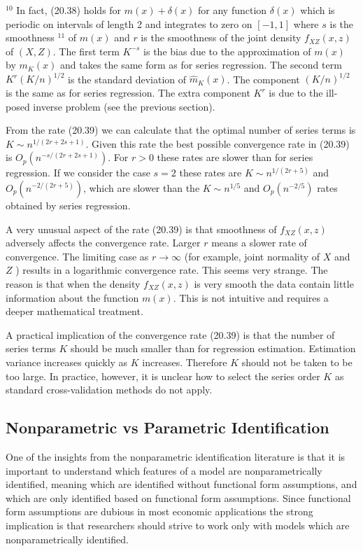 \documentclass[10pt]{article}
\begin{document}
${ }^{10}$ In fact, (20.38) holds for $m(x)+\delta(x)$ for any function $\delta(x)$ which is periodic on intervals of length 2 and integrates to zero on $[-1,1]$ where $s$ is the smoothness ${ }^{11}$ of $m(x)$ and $r$ is the smoothness of the joint density $f_{X Z}(x, z)$ of $(X, Z)$. The first term $K^{-s}$ is the bias due to the approximation of $m(x)$ by $m_{K}(x)$ and takes the same form as for series regression. The second term $K^{r}(K / n)^{1 / 2}$ is the standard deviation of $\widehat{m}_{K}(x)$. The component $(K / n)^{1 / 2}$ is the same as for series regression. The extra component $K^{r}$ is due to the ill-posed inverse problem (see the previous section).

From the rate (20.39) we can calculate that the optimal number of series terms is $K \sim n^{1 /(2 r+2 s+1)}$. Given this rate the best possible convergence rate in (20.39) is $O_{p}\left(n^{-s /(2 r+2 s+1)}\right)$. For $r>0$ these rates are slower than for series regression. If we consider the case $s=2$ these rates are $K \sim n^{1 /(2 r+5)}$ and $O_{p}\left(n^{-2 /(2 r+5)}\right)$, which are slower than the $K \sim n^{1 / 5}$ and $O_{p}\left(n^{-2 / 5}\right)$ rates obtained by series regression.

A very unusual aspect of the rate (20.39) is that smoothness of $f_{X Z}(x, z)$ adversely affects the convergence rate. Larger $r$ means a slower rate of convergence. The limiting case as $r \rightarrow \infty$ (for example, joint normality of $X$ and $Z$ ) results in a logarithmic convergence rate. This seems very strange. The reason is that when the density $f_{X Z}(x, z)$ is very smooth the data contain little information about the function $m(x)$. This is not intuitive and requires a deeper mathematical treatment.

A practical implication of the convergence rate (20.39) is that the number of series terms $K$ should be much smaller than for regression estimation. Estimation variance increases quickly as $K$ increases. Therefore $K$ should not be taken to be too large. In practice, however, it is unclear how to select the series order $K$ as standard cross-validation methods do not apply.

\subsection{Nonparametric vs Parametric Identification}
One of the insights from the nonparametric identification literature is that it is important to understand which features of a model are nonparametrically identified, meaning which are identified without functional form assumptions, and which are only identified based on functional form assumptions. Since functional form assumptions are dubious in most economic applications the strong implication is that researchers should strive to work only with models which are nonparametrically identified.
\end{document}
